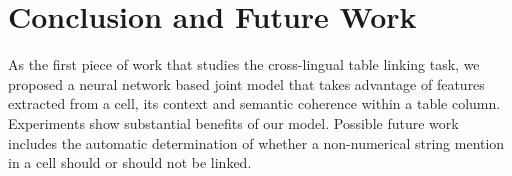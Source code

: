 \section{Conclusion and Future Work}

As the first piece of work that studies
the cross-lingual table linking task, we proposed a neural
network based joint model that takes advantage of features extracted from
a cell, its context and semantic coherence within a table column. 
Experiments show substantial benefits of our model.
Possible future work includes
the automatic determination of whether a non-numerical string mention in 
a cell should or should not be linked. 

